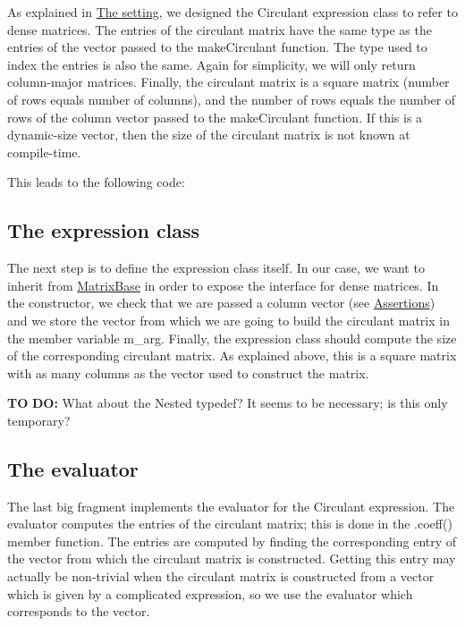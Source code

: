As explained in \hyperlink{_topic_new_expression_type_TopicSetting}{The setting}, we designed the {\ttfamily Circulant} expression class to refer to dense matrices. The entries of the circulant matrix have the same type as the entries of the vector passed to the {\ttfamily make\+Circulant} function. The type used to index the entries is also the same. Again for simplicity, we will only return column-\/major matrices. Finally, the circulant matrix is a square matrix (number of rows equals number of columns), and the number of rows equals the number of rows of the column vector passed to the {\ttfamily make\+Circulant} function. If this is a dynamic-\/size vector, then the size of the circulant matrix is not known at compile-\/time.

This leads to the following code\+:


\begin{DoxyCodeInclude}
\end{DoxyCodeInclude}
\hypertarget{_topic_new_expression_type_TopicExpression}{}\subsection{The expression class}\label{_topic_new_expression_type_TopicExpression}
The next step is to define the expression class itself. In our case, we want to inherit from {\ttfamily \hyperlink{group___core___module_class_eigen_1_1_matrix_base}{Matrix\+Base}} in order to expose the interface for dense matrices. In the constructor, we check that we are passed a column vector (see \hyperlink{TopicAssertions}{Assertions}) and we store the vector from which we are going to build the circulant matrix in the member variable {\ttfamily m\+\_\+arg}. Finally, the expression class should compute the size of the corresponding circulant matrix. As explained above, this is a square matrix with as many columns as the vector used to construct the matrix.

{\bfseries TO} {\bfseries DO\+:} What about the {\ttfamily Nested} typedef? It seems to be necessary; is this only temporary?


\begin{DoxyCodeInclude}
\end{DoxyCodeInclude}
\hypertarget{_topic_new_expression_type_TopicEvaluator}{}\subsection{The evaluator}\label{_topic_new_expression_type_TopicEvaluator}
The last big fragment implements the evaluator for the {\ttfamily Circulant} expression. The evaluator computes the entries of the circulant matrix; this is done in the {\ttfamily }.coeff() member function. The entries are computed by finding the corresponding entry of the vector from which the circulant matrix is constructed. Getting this entry may actually be non-\/trivial when the circulant matrix is constructed from a vector which is given by a complicated expression, so we use the evaluator which corresponds to the vector.


